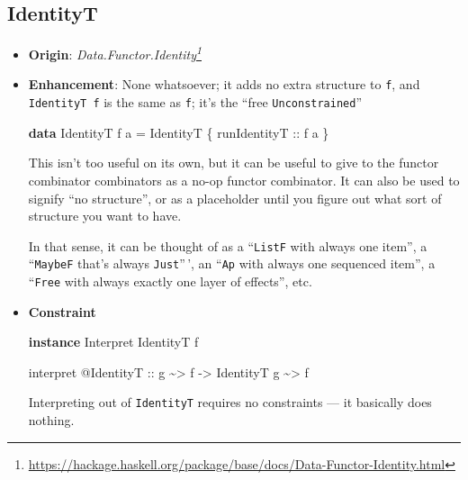 \documentclass[]{article}
\newenvironment{Shaded}{}{}
\newcommand{\DataTypeTok}[1]{\textcolor[rgb]{0.56,0.13,0.00}{#1}}
\newcommand{\KeywordTok}[1]{\textcolor[rgb]{0.00,0.44,0.13}{\textbf{#1}}}
\newcommand{\NormalTok}[1]{#1}
\newcommand{\OperatorTok}[1]{\textcolor[rgb]{0.40,0.40,0.40}{#1}}
\newcommand{\OtherTok}[1]{\textcolor[rgb]{0.00,0.44,0.13}{#1}}
\renewcommand{\href}[2]{#2\footnote{\url{#1}}}
\begin{document}
\subsection{IdentityT}\label{identityt}

\begin{itemize}
\item
  \textbf{Origin}:
  \emph{\href{https://hackage.haskell.org/package/base/docs/Data-Functor-Identity.html}{Data.Functor.Identity}}
\item
  \textbf{Enhancement}: None whatsoever; it adds no extra structure to
  \texttt{f}, and \texttt{IdentityT\ f} is the same as \texttt{f}; it's the
  ``free \texttt{Unconstrained}''

\begin{Shaded}
\begin{Highlighting}[]
\KeywordTok{data} \DataTypeTok{IdentityT}\NormalTok{ f a }\OtherTok{=} \DataTypeTok{IdentityT}\NormalTok{ \{}\OtherTok{ runIdentityT ::}\NormalTok{ f a \}}
\end{Highlighting}
\end{Shaded}

  This isn't too useful on its own, but it can be useful to give to the functor
  combinator combinators as a no-op functor combinator. It can also be used to
  signify ``no structure'', or as a placeholder until you figure out what sort
  of structure you want to have.

  In that sense, it can be thought of as a ``\texttt{ListF} with always one
  item'', a ``\texttt{MaybeF} that's always \texttt{Just}''\,', an ``\texttt{Ap}
  with always one sequenced item'', a ``\texttt{Free} with always exactly one
  layer of effects'', etc.
\item
  \textbf{Constraint}

\begin{Shaded}
\begin{Highlighting}[]
\KeywordTok{instance} \DataTypeTok{Interpret} \DataTypeTok{IdentityT}\NormalTok{ f}

\NormalTok{interpret }\OperatorTok{@}\DataTypeTok{IdentityT}
\OtherTok{    ::}\NormalTok{ g }\OperatorTok{\textasciitilde{}\textgreater{}}\NormalTok{ f}
    \OtherTok{{-}\textgreater{}} \DataTypeTok{IdentityT}\NormalTok{ g }\OperatorTok{\textasciitilde{}\textgreater{}}\NormalTok{ f}
\end{Highlighting}
\end{Shaded}

  Interpreting out of \texttt{IdentityT} requires no constraints --- it
  basically does nothing.
\end{itemize}
\end{document}

